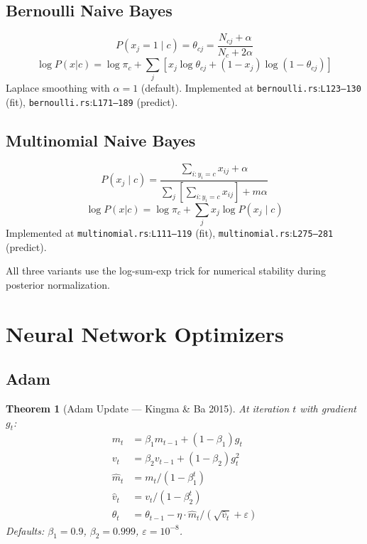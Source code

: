\documentclass[11pt,a4paper]{article}
\newtheorem{theorem}{Theorem}[section]
\theoremstyle{remark}
\newcommand{\coderef}[2]{\texttt{#1}:\texttt{L#2}}
\begin{document}
\subsection{Bernoulli Naive Bayes}

\begin{equation}
  P(x_j = 1 \mid c) = \theta_{cj} = \frac{N_{cj} + \alpha}{N_c + 2\alpha}
  \label{eq:bernoulli-nb}
\end{equation}
\begin{equation}
  \log P(x|c) = \log\pi_c + \sum_j [x_j \log\theta_{cj} + (1{-}x_j)\log(1{-}\theta_{cj})]
  \label{eq:bernoulli-ll}
\end{equation}
Laplace smoothing with $\alpha = 1$ (default).
Implemented at \coderef{bernoulli.rs}{123--130} (fit), \coderef{bernoulli.rs}{171--189} (predict). \checkmark

\subsection{Multinomial Naive Bayes}

\begin{equation}
  P(x_j \mid c) = \frac{\sum_{i: y_i = c} x_{ij} + \alpha}{\sum_j [\sum_{i: y_i = c} x_{ij}] + m\alpha}
  \label{eq:multinomial-nb}
\end{equation}
\begin{equation}
  \log P(x|c) = \log\pi_c + \sum_j x_j \log P(x_j \mid c)
  \label{eq:multinomial-ll}
\end{equation}
Implemented at \coderef{multinomial.rs}{111--119} (fit), \coderef{multinomial.rs}{275--281} (predict). \checkmark

All three variants use the log-sum-exp trick for numerical stability during
posterior normalization.

\section{Neural Network Optimizers}
\label{sec:optim}

\subsection{Adam}

\begin{theorem}[Adam Update --- Kingma \& Ba 2015]
\label{thm:adam}
At iteration $t$ with gradient $g_t$:
\begin{align}
  m_t &= \beta_1 m_{t-1} + (1 - \beta_1) g_t \label{eq:adam-m}\\
  v_t &= \beta_2 v_{t-1} + (1 - \beta_2) g_t^2 \label{eq:adam-v}\\
  \hat{m}_t &= m_t / (1 - \beta_1^t) \label{eq:adam-mhat}\\
  \hat{v}_t &= v_t / (1 - \beta_2^t) \label{eq:adam-vhat}\\
  \theta_t &= \theta_{t-1} - \eta \cdot \hat{m}_t / (\sqrt{\hat{v}_t} + \varepsilon)
    \label{eq:adam-update}
\end{align}
Defaults: $\beta_1 = 0.9$, $\beta_2 = 0.999$, $\varepsilon = 10^{-8}$.
\end{theorem}
\end{document}
